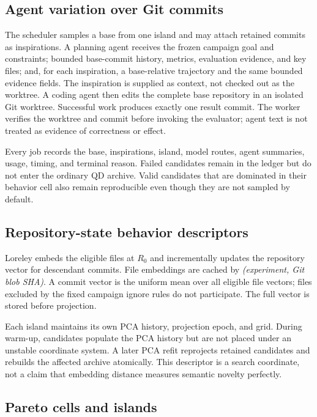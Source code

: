 \documentclass[10pt,twocolumn]{article}
\begin{document}
\subsection{Agent variation over Git commits}

The scheduler samples a base from one island and may attach retained commits as
inspirations. A planning agent receives the frozen campaign goal and
constraints; bounded base-commit history, metrics, evaluation evidence, and key
files; and, for each inspiration, a base-relative trajectory and the same
bounded evidence fields. The inspiration is supplied as context, not checked
out as the worktree. A coding agent then edits the complete base repository in
an isolated Git worktree. Successful work produces exactly one result commit.
The worker verifies the worktree and commit before invoking the evaluator;
agent text is not treated as evidence of correctness or effect.

Every job records the base, inspirations, island, model routes, agent summaries,
usage, timing, and terminal reason. Failed candidates remain in the ledger but
do not enter the ordinary QD archive. Valid candidates that are dominated in
their behavior cell also remain reproducible even though they are not sampled
by default.

\subsection{Repository-state behavior descriptors}

Loreley embeds the eligible files at $R_0$ and incrementally updates the
repository vector for descendant commits. File embeddings are cached by
\emph{(experiment, Git blob SHA)}. A commit vector is the uniform mean over all
eligible file vectors; files excluded by the fixed campaign ignore rules do not
participate. The full vector is stored before projection.

Each island maintains its own PCA history, projection epoch, and grid. During
warm-up, candidates populate the PCA history but are not placed under an
unstable coordinate system. A later PCA refit reprojects retained candidates
and rebuilds the affected archive atomically. This descriptor is a search
coordinate, not a claim that embedding distance measures semantic novelty
perfectly.

\subsection{Pareto cells and islands}
\end{document}
